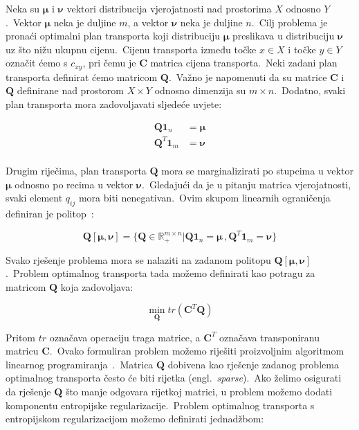 \documentclass[diplomskirad]{fer}
\begin{document}
Neka su $\bm{\mu}$ i $\bm{\nu}$ vektori distribucija vjerojatnosti nad prostorima $X$ odnosno $Y$.\ Vektor $\bm{\mu}$ neka je duljine $m$, a vektor $\bm{\nu}$ neka je duljine $n$.\
Cilj problema je pronaći optimalni plan transporta koji distribuciju $\bm{\mu}$ preslikava u distribuciju $\bm{\nu}$ uz što nižu ukupnu cijenu.\ 
Cijenu transporta između točke $x \in X$ i točke $y \in Y$ označit ćemo s $c_{xy}$, pri čemu je $\bm{C}$ matrica cijena transporta.\ 
Neki zadani plan transporta definirat ćemo matricom $\bm{Q}$.\ Važno je napomenuti da su matrice $\bm{C}$ i $\bm{Q}$ definirane nad prostorom $X \times Y$ odnosno dimenzija su $m \times n$.\ 
Dodatno, svaki plan transporta mora zadovoljavati sljedeće uvjete:

\begin{equation}
  \begin{aligned}
    \bm{Q} \bm{1}_n &= \bm{\mu} \\
    \bm{Q}^T \bm{1}_m &= \bm{\nu} \\
  \end{aligned}
  \label{eq:ot_plan_conds}
\end{equation}

Drugim riječima, plan transporta $\bm{Q}$ mora se marginalizirati po stupcima u vektor $\bm{\mu}$ odnosno po recima u vektor $\bm{\nu}$.\ Gledajući da je u pitanju matrica vjerojatnosti, svaki element $q_{ij}$ mora biti nenegativan.\ 
Ovim skupom linearnih ograničenja definiran je politop~\cite{ziegler1993lectures}:

\begin{equation}
  \bm{Q}\left[ \bm{\mu}, \bm{\nu} \right] = \{ \bm{Q} \in \mathbb{R}_{+}^{m \times n} | \bm{Q} \bm{1}_n = \bm{\mu}\,, \bm{Q}^T \bm{1}_m = \bm{\nu} \}
  \label{eq:ot_polytope}
\end{equation}

Svako rješenje problema mora se nalaziti na zadanom politopu $\bm{Q}\left[ \bm{\mu}, \bm{\nu} \right]$.\ Problem optimalnog transporta tada možemo definirati kao potragu za matricom $\bm{Q}$ koja zadovoljava:

\begin{equation}
  \min_{\bm{Q}} tr(\bm{C}^T \bm{Q})
  \label{eq:ot_basic}
\end{equation}

Pritom $tr$ označava operaciju traga matrice, a $\bm{C}^T$ označava transponiranu matricu $\bm{C}$.\ Ovako formuliran problem možemo riješiti proizvoljnim algoritmom linearnog programiranja~\cite{dantzig2002linear}.\ 
Matrica $\bm{Q}$ dobivena kao rješenje zadanog problema optimalnog transporta često će biti rijetka (engl.\ \textit{sparse}).\ 
Ako želimo osigurati da rješenje $\bm{Q}$ što manje odgovara rijetkoj matrici, u problem možemo dodati komponentu entropijske regularizacije.\ 
Problem optimalnog transporta s entropijskom regularizacijom možemo definirati jednadžbom:
\end{document}
